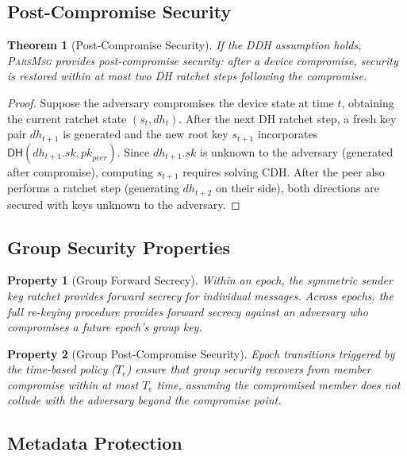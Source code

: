 \documentclass[11pt,a4paper]{article}
\newcommand{\protname}{\textsc{ParsMsg}\xspace}
\newtheorem{theorem}{Theorem}
\newtheorem{property}{Property}
\begin{document}
\subsection{Post-Compromise Security}

\begin{theorem}[Post-Compromise Security]
\label{thm:pcs}
If the DDH assumption holds, \protname provides post-compromise security: after a device compromise, security is restored within at most two DH ratchet steps following the compromise.
\end{theorem}

\begin{proof}
Suppose the adversary compromises the device state at time $t$, obtaining the current ratchet state $(s_t, \mathit{dh}_t)$. After the next DH ratchet step, a fresh key pair $\mathit{dh}_{t+1}$ is generated and the new root key $s_{t+1}$ incorporates $\mathsf{DH}(\mathit{dh}_{t+1}.\mathit{sk}, \mathit{pk}_{\mathit{peer}})$. Since $\mathit{dh}_{t+1}.\mathit{sk}$ is unknown to the adversary (generated after compromise), computing $s_{t+1}$ requires solving CDH. After the peer also performs a ratchet step (generating $\mathit{dh}_{t+2}$ on their side), both directions are secured with keys unknown to the adversary.
\end{proof}

\subsection{Group Security Properties}

\begin{property}[Group Forward Secrecy]
Within an epoch, the symmetric sender key ratchet provides forward secrecy for individual messages. Across epochs, the full re-keying procedure provides forward secrecy against an adversary who compromises a future epoch's group key.
\end{property}

\begin{property}[Group Post-Compromise Security]
Epoch transitions triggered by the time-based policy ($T_e$) ensure that group security recovers from member compromise within at most $T_e$ time, assuming the compromised member does not collude with the adversary beyond the compromise point.
\end{property}

\subsection{Metadata Protection}
\end{document}
